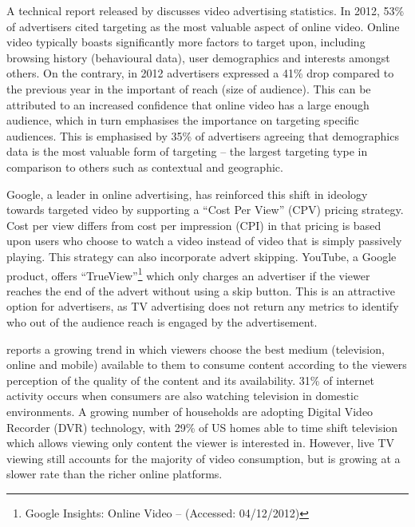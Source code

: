 	A technical report released by \citet{brightroll-report} discusses video advertising statistics. In 2012, 53\% of advertisers cited targeting as the most valuable aspect of online video. Online video typically boasts significantly more factors to target upon, including browsing history (behavioural data), user demographics and interests amongst others. On the contrary, in 2012 advertisers expressed a 41\% drop compared to the previous year in the important of reach (size of audience). This can be attributed to an increased confidence that online video has a large enough audience, which in turn emphasises the importance on targeting specific audiences. This is emphasised by 35\% of advertisers agreeing that demographics data is the most valuable form of targeting -- the largest targeting type in comparison to others such as contextual and geographic.


	Google, a leader in online advertising, has reinforced this shift in ideology towards targeted video by supporting a ``Cost Per View'' (CPV) pricing strategy. Cost per view differs from cost per impression (CPI) in that pricing is based upon users who choose to watch a video instead of video that is simply passively playing. This strategy can also incorporate advert skipping. YouTube, a Google product, offers ``TrueView''\footnote{Google Insights: Online Video --  (Accessed: 04/12/2012)} which only charges an advertiser if the viewer reaches the end of the advert without using a skip button. This is an attractive option for advertisers, as TV advertising does not return any metrics to identify who out of the audience reach is engaged by the advertisement.

	\citet{three-screen} reports a growing trend in which viewers choose the best medium (television, online and mobile) available to them to consume content according to the viewers perception of the quality of the content and its availability. 31\% of internet activity occurs when consumers are also watching television in domestic environments. A growing number of households are adopting Digital Video Recorder (DVR) technology, with 29\% of US homes able to time shift television which allows viewing only content the viewer is interested in. However, live TV viewing still accounts for the majority of video consumption, but is growing at a slower rate than the richer online platforms.


